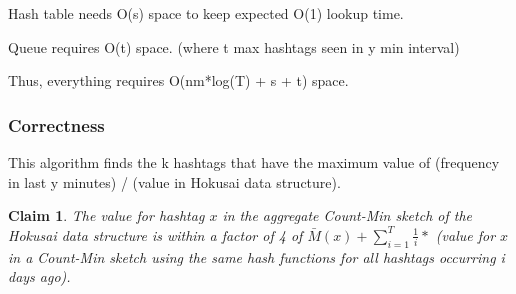 \documentclass[a4paper,12pt]{article}
\newtheorem{claim}{Claim}
\begin{document}
Hash table needs O(s) space to keep expected O(1) lookup time.

Queue requires O(t) space. (where t max hashtags seen in y min interval)

Thus, everything requires O(nm*log(T) + s + t) space.

\subsubsection{Correctness \label{Correct}}

This algorithm finds the k hashtags that have the maximum value of (frequency in last y minutes) / (value in Hokusai data structure).

\begin{claim}
The value for hashtag $x$ in the aggregate Count-Min sketch of the Hokusai data structure is within a factor of 4 of $\bar{M}(x) + \sum\limits_{i=1}^T \frac{1}{i}*$ (value for $x$ in a Count-Min sketch using the same hash functions for all hashtags occurring i days ago).
\end{claim}
\end{document}
